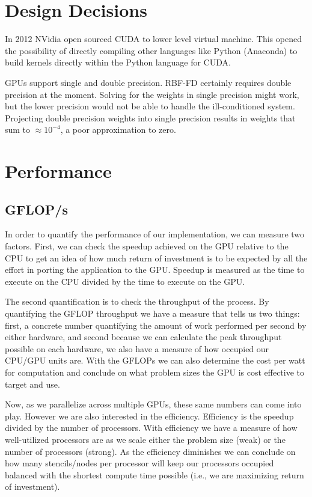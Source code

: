 \documentclass{report}
\begin{document}
\section{Design Decisions}

In 2012 NVidia open sourced CUDA to lower level virtual machine. This opened the possibility of directly compiling other languages like Python (Anaconda) to build kernels directly within the Python language for CUDA. 

GPUs support single and double precision. RBF-FD certainly requires double precision at the moment. Solving for the weights in single precision might work, but the lower precision would not be able to handle the ill-conditioned system. Projecting double precision weights into single precision results in weights that sum to $\approx 10^{-4}$, a poor approximation to zero. 


\section{Performance}
\subsection{GFLOP/s}
In order to quantify the performance of our implementation, we can measure two
factors. First, we can check the speedup achieved on the GPU relative to the
CPU to get an idea of how much return of investment is to be expected by all
the effort in porting the application to the GPU. Speedup is measured as the
time to execute on the CPU divided by the time to execute on the GPU. 

The second quantification is to check the throughput of the process. By
quantifying the GFLOP throughput we have a measure that tells us two things:
first, a concrete number quantifying the amount of work performed per second by
either hardware, and second because we can calculate the peak throughput possible on
each hardware, we also have a measure of how occupied our CPU/GPU units are.
With the GFLOPs we can also determine the cost per watt for computation and
conclude on what problem sizes the GPU is cost effective to target and use. 

Now, as we parallelize across multiple GPUs, these same numbers can come into
play. However we are also interested in the efficiency. Efficiency is the
speedup divided by the number of processors. With efficiency we have a measure
of how well-utilized processors are as we scale either the problem size (weak)
or the number of processors (strong). As the efficiency diminishes we can
conclude on how many stencils/nodes per processor will keep our processors
occupied balanced with the shortest compute time possible (i.e., we are
maximizing return of investment). 
\end{document}
